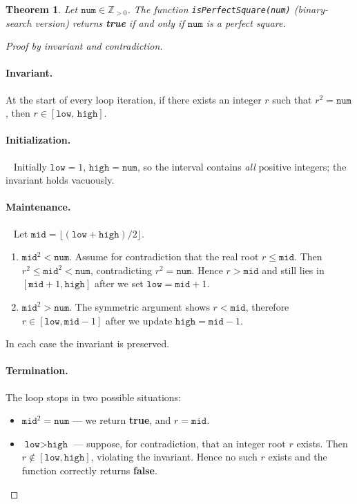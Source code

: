 \documentclass[12pt]{article}
\newtheorem{theorem}{Theorem}
\begin{document}
\begin{theorem}
Let $\texttt{num}\in\mathbb{Z}_{>0}$.  
The function \texttt{isPerfectSquare(num)} (binary-search version) returns
{\bf true} if and only if $\texttt{num}$ is a perfect square.
\end{theorem}

\begin{proof}[Proof by invariant and contradiction]
%
\paragraph{Invariant.}
At the start of every loop iteration, if there exists an integer
$r$ such that $r^2=\texttt{num}$, then $r\in[\texttt{low},\,\texttt{high}]$.

\paragraph{Initialization.}~
Initially $\texttt{low}=1,\,\texttt{high}=\texttt{num}$, so the interval
contains \emph{all} positive integers; the invariant holds vacuously.

\paragraph{Maintenance.}~
Let $\texttt{mid}=\bigl\lfloor(\texttt{low}+\texttt{high})/2\bigr\rfloor$.

\begin{enumerate}[label=\textbf{Case \arabic*:}, wide=0pt]
  \item $\texttt{mid}^2<\texttt{num}$.  
        Assume for contradiction that the real root $r\le\texttt{mid}$.  
        Then $r^2\le\texttt{mid}^2<\texttt{num}$, contradicting $r^2=\texttt{num}$.  
        Hence $r>\texttt{mid}$ and still lies in
        $[\texttt{mid}+1,\texttt{high}]$ after we set
        $\texttt{low}=\texttt{mid}+1$.
  \item $\texttt{mid}^2>\texttt{num}$.  
        The symmetric argument shows $r<\texttt{mid}$, therefore
        $r\in[\texttt{low},\texttt{mid}-1]$ after we update
        $\texttt{high}=\texttt{mid}-1$.
\end{enumerate}
In each case the invariant is preserved.

\paragraph{Termination.}
The loop stops in two possible situations:
\begin{itemize}
  \item $\texttt{mid}^2=\texttt{num}$ --- we return \textbf{true}, and $r=\texttt{mid}$.
  \item $\texttt{low}>\texttt{high}$ --- suppose, for contradiction, that an
        integer root $r$ exists.  Then $r\notin[\texttt{low},\texttt{high}]$,
        violating the invariant.  Hence no such $r$ exists and the function
        correctly returns \textbf{false}.
\end{itemize}
\end{proof}
\end{document}
